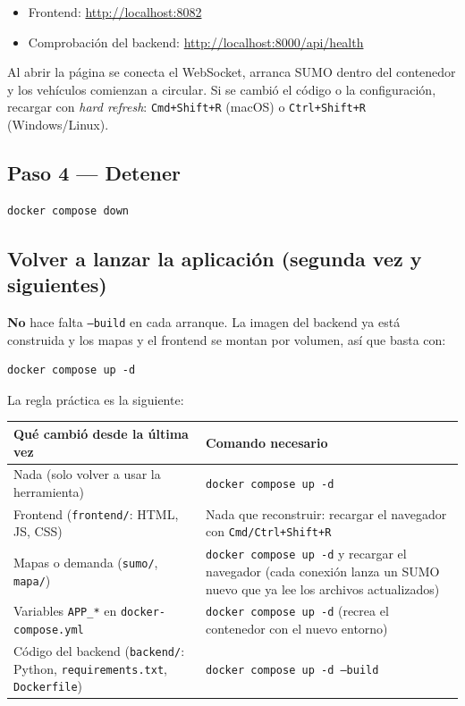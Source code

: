 \documentclass[11pt,a4paper]{article}
\begin{document}
\begin{itemize}
  \item Frontend: \url{http://localhost:8082}
  \item Comprobación del backend: \url{http://localhost:8000/api/health}
\end{itemize}

Al abrir la página se conecta el WebSocket, arranca SUMO dentro del contenedor y
los vehículos comienzan a circular. Si se cambió el código o la configuración,
recargar con \emph{hard refresh}: \texttt{Cmd+Shift+R} (macOS) o
\texttt{Ctrl+Shift+R} (Windows/Linux).

\subsection{Paso 4 --- Detener}

\begin{lstlisting}
docker compose down
\end{lstlisting}

\subsection{Volver a lanzar la aplicación (segunda vez y siguientes)}

\textbf{No} hace falta \texttt{--build} en cada arranque. La imagen del backend
ya está construida y los mapas y el frontend se montan por volumen, así que
basta con:

\begin{lstlisting}
docker compose up -d
\end{lstlisting}

La regla práctica es la siguiente:

\begin{longtable}{@{}p{7.6cm}p{6.7cm}@{}}
\toprule
\textbf{Qué cambió desde la última vez} & \textbf{Comando necesario} \\
\midrule
Nada (solo volver a usar la herramienta) & \texttt{docker compose up -d} \\
Frontend (\texttt{frontend/}: HTML, JS, CSS) & Nada que reconstruir: recargar el
  navegador con \texttt{Cmd/Ctrl+Shift+R} \\
Mapas o demanda (\texttt{sumo/}, \texttt{mapa/}) & \texttt{docker compose up -d}
  y recargar el navegador (cada conexión lanza un SUMO nuevo que ya lee los
  archivos actualizados) \\
Variables \texttt{APP\_*} en \texttt{docker-compose.yml} &
  \texttt{docker compose up -d} (recrea el contenedor con el nuevo entorno) \\
Código del backend (\texttt{backend/}: Python, \texttt{requirements.txt},
  \texttt{Dockerfile}) & \texttt{docker compose up -d --build} \\
\bottomrule
\end{longtable}
\end{document}
